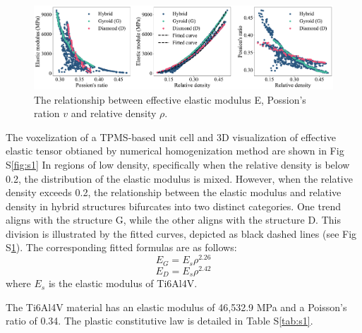 \documentclass[preprint,review,12pt,authoryear]{elsarticle}
\begin{document}
\begin{figure}
    \centering
    \includegraphics[width=1\linewidth]{figures/S2.pdf}
    \caption{The relationship between effective elastic modulus E, Possion's ration $v$ and relative density $\rho$.}
    \label{fig:s2}
\end{figure}

The voxelization of a TPMS-based unit cell and 3D visualization of effective elastic tensor obtianed by numerical homogenization method are shown in Fig S\ref{fig:s1}
In regions of low density, specifically when the relative density is below 0.2, the distribution of the elastic modulus is mixed. However, when the relative density exceeds 0.2, the relationship between the elastic modulus and relative density in hybrid structures bifurcates into two distinct categories. One trend aligns with the structure G, while the other aligns with the structure D. This division is illustrated by the fitted curves, depicted as black dashed lines (see Fig S\ref{fig:s2}). The corresponding fitted formulas are as follows:
\begin{equation}
    E_G = E_s\rho^{2.26}
\end{equation}
\begin{equation}
    E_D = E_s\rho^{2.42}
\end{equation}
where $E_s$ is the elastic modulus of Ti6Al4V.

The Ti6Al4V material has an elastic modulus of 46,532.9 MPa and a Poisson's ratio of 0.34. The plastic constitutive law is detailed in Table S\ref{tab:s1}\citep{Peng2023}.
\end{document}

